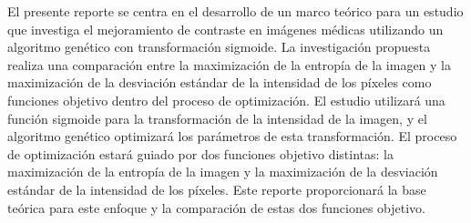El presente reporte se centra en el desarrollo de un marco teórico para un estudio que investiga el mejoramiento de contraste en imágenes médicas utilizando un algoritmo genético con transformación sigmoide. La investigación propuesta realiza una comparación entre la maximización de la entropía de la imagen y la maximización de la desviación estándar de la intensidad de los píxeles como funciones objetivo dentro del proceso de optimización. El estudio utilizará una función sigmoide para la transformación de la intensidad de la imagen, y el algoritmo genético optimizará los parámetros de esta transformación. El proceso de optimización estará guiado por dos funciones objetivo distintas: la maximización de la entropía de la imagen y la maximización de la desviación estándar de la intensidad de los píxeles. Este reporte proporcionará la base teórica para este enfoque y la comparación de estas dos funciones objetivo.
